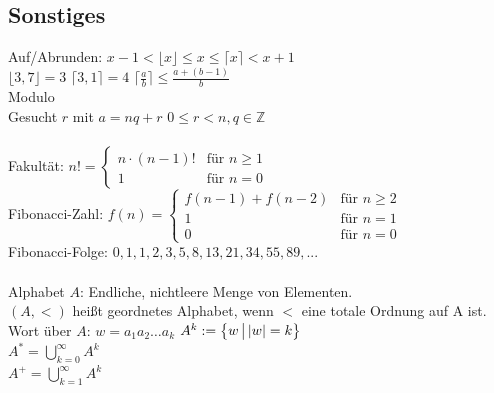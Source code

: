 \documentclass[fs, footer]{latex4ei}
\begin{document}
\begin{multicols*}{4}
\subsection{Sonstiges}
Auf/Abrunden: $x-1 < \lfloor x \rfloor \le x \le \lceil x \rceil < x+1$\\
$\lfloor 3,7 \rfloor = 3$ \qquad $\lceil 3,1 \rceil = 4$ \qquad $\lceil \frac{a}{b} \rceil \le \frac{a+(b-1)}{b}$\\[0.5em]
Modulo \\
Gesucht $r$ mit $a = nq +r$ \qquad $0 \le r < n, q \in \mathbb Z$\\
\\
Fakultät: $n! = \begin{cases} n \cdot (n-1)! & \text{für } n \ge 1 \\ 1  & \text{für } n = 0 \end{cases}$\\
Fibonacci-Zahl: $f(n) = \begin{cases} f(n-1) + f(n-2) & \text{für } n\ge 2\\ 1 & \text{für } n = 1 \\ 0 & \text{für } n = 0 \end{cases}$\\
Fibonacci-Folge: $0,1,1,2,3,5,8,13,21,34,55,89,...$\\
\\
Alphabet $A$: Endliche, nichtleere Menge von Elementen.\\
$(A,<)$ heißt geordnetes Alphabet, wenn $<$ eine totale Ordnung auf A ist.\\
Wort über $A$: $w=a_1 a_2 \ldots a_k$
$A^k := \bigl\{ \bigl. w \, \bigr| \, |w|=k \bigr\}$\\
$A^{*} = \bigcup\limits_{k=0}^\infty A^k$\\
$A^{+} = \bigcup\limits_{k=1}^\infty A^k$

\end{multicols*}
\end{document}
